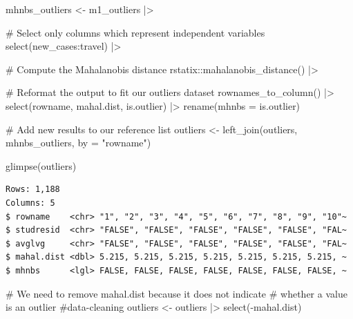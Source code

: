\documentclass[
  letterpaper,
  DIV=11,
  numbers=noendperiod]{scrreprt}
\newenvironment{Shaded}{\begin{snugshade}}{\end{snugshade}}
\newcommand{\AttributeTok}[1]{\textcolor[rgb]{0.40,0.45,0.13}{#1}}
\newcommand{\CommentTok}[1]{\textcolor[rgb]{0.37,0.37,0.37}{#1}}
\newcommand{\FunctionTok}[1]{\textcolor[rgb]{0.28,0.35,0.67}{#1}}
\newcommand{\NormalTok}[1]{\textcolor[rgb]{0.00,0.23,0.31}{#1}}
\newcommand{\OtherTok}[1]{\textcolor[rgb]{0.00,0.23,0.31}{#1}}
\newcommand{\SpecialCharTok}[1]{\textcolor[rgb]{0.37,0.37,0.37}{#1}}
\newcommand{\StringTok}[1]{\textcolor[rgb]{0.13,0.47,0.30}{#1}}
\begin{document}
\begin{Shaded}
\begin{Highlighting}[]
\NormalTok{mhnbs\_outliers }\OtherTok{\textless{}{-}}
\NormalTok{  m1\_outliers }\SpecialCharTok{|\textgreater{}}
  
  \CommentTok{\# Select only columns which represent independent variables}
  \FunctionTok{select}\NormalTok{(new\_cases}\SpecialCharTok{:}\NormalTok{travel) }\SpecialCharTok{|\textgreater{}}
  
  \CommentTok{\# Compute the Mahalanobis distance}
\NormalTok{  rstatix}\SpecialCharTok{::}\FunctionTok{mahalanobis\_distance}\NormalTok{() }\SpecialCharTok{|\textgreater{}}
  
  \CommentTok{\# Reformat the output to fit our \textquotesingle{}outliers\textquotesingle{} dataset}
  \FunctionTok{rownames\_to\_column}\NormalTok{() }\SpecialCharTok{|\textgreater{}}
  \FunctionTok{select}\NormalTok{(rowname, mahal.dist, is.outlier) }\SpecialCharTok{|\textgreater{}}
  \FunctionTok{rename}\NormalTok{(}\AttributeTok{mhnbs =}\NormalTok{ is.outlier)}

\CommentTok{\# Add new results to our reference list}
\NormalTok{outliers }\OtherTok{\textless{}{-}} \FunctionTok{left\_join}\NormalTok{(outliers, mhnbs\_outliers, }\AttributeTok{by =} \StringTok{"rowname"}\NormalTok{)}

\FunctionTok{glimpse}\NormalTok{(outliers)}
\end{Highlighting}
\end{Shaded}

\begin{verbatim}
Rows: 1,188
Columns: 5
$ rowname    <chr> "1", "2", "3", "4", "5", "6", "7", "8", "9", "10"~
$ studresid  <chr> "FALSE", "FALSE", "FALSE", "FALSE", "FALSE", "FAL~
$ avglvg     <chr> "FALSE", "FALSE", "FALSE", "FALSE", "FALSE", "FAL~
$ mahal.dist <dbl> 5.215, 5.215, 5.215, 5.215, 5.215, 5.215, 5.215, ~
$ mhnbs      <lgl> FALSE, FALSE, FALSE, FALSE, FALSE, FALSE, FALSE, ~
\end{verbatim}

\begin{Shaded}
\begin{Highlighting}[]
\CommentTok{\# We need to remove mahal.dist because it does not indicate}
\CommentTok{\# whether a value is an outlier \#data{-}cleaning}
\NormalTok{outliers }\OtherTok{\textless{}{-}}\NormalTok{ outliers }\SpecialCharTok{|\textgreater{}} \FunctionTok{select}\NormalTok{(}\SpecialCharTok{{-}}\NormalTok{mahal.dist)}
\end{Highlighting}
\end{Shaded}
\end{document}
